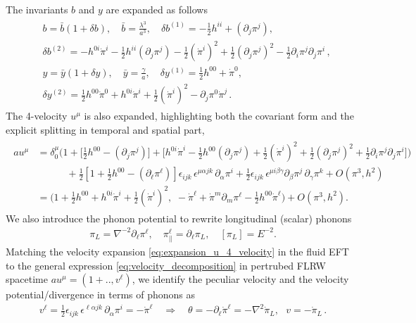 The invariants $b$ and $y$ are expanded as follows
{\small\begin{align}\label{eq:expansions_b_y}
\begin{aligned}
    &b= \bar{b}(1+\delta b),\quad \bar{b}= \frac{\lambda^3}{a^3},\quad
    \delta b^{(1)} = -\tfrac12 h^{ii} +(\partial_j \pi^j),\\[3pt]
    &\delta b^{(2)} = - h^{0 i} \dot{\pi}^i - \tfrac12  h^{ii} (\partial_j \pi^j) - \tfrac12 (\dot{\pi}^i)^2 + \tfrac12 (\partial_j \pi^j)^2 -\tfrac12 \partial_i\pi^j\partial_j\pi^i\,,
    \\[3pt]
    &y= \bar{y}(1+\delta y),\quad \bar{y}= \frac{\gamma}{a},\quad \delta y^{(1)} = \tfrac12 h^{00}+ \dot{\pi}^0,\\[3pt]
    &\delta y^{(2)} = \tfrac12 h^{00}\dot{\pi}^0+ h^{0 i} \dot{\pi}^i  + \tfrac12 (\dot{\pi}^i)^2 -\partial_j\pi^0\dot{\pi}^j\,.
\end{aligned}\end{align}}
The 4-velocity $u^\mu$ is also expanded, highlighting both the covariant form and the explicit splitting in temporal and spatial part,
{\small\begin{align}\label{eq:expansion_u_4_velocity}
\begin{aligned}
    au^\mu&=\delta_0^\mu \bigg(1 \!+\! \Big[\tfrac12 h^{00} -(\partial_j \pi^j)\Big]\! +\! \Big[ h^{0 i} \dot{\pi}^i -\tfrac12 h^{00} (\partial_j \pi^j) + \tfrac12 (\dot{\pi}^i)^2 + \tfrac12 (\partial_j \pi^j)^2 +\tfrac12 \partial_i\pi^j\partial_j\pi^i\Big]\bigg)
    \\
    &\quad\qquad+\tfrac{1}{2}\left[1 + \tfrac12 h^{00}-(\partial_\ell\pi^\ell)\right]
     \epsilon_{i j k}\,\epsilon^{\mu \alpha j k}\,\partial_\alpha\pi^i 
     +\frac{1}{2} \epsilon_{ijk}\, \epsilon^{\mu i \beta\gamma}\partial_\beta\pi^j\,\partial_\gamma\pi^k
    + O(\pi^3, h^2)\\[3pt]
    &=\Big(1 + \tfrac12 h^{00} +h^{0i}\dot{\pi}^i+ \tfrac12 (\dot{\pi}^i)^2,\,\,- \dot{\pi}^\ell + \dot{\pi}^m \partial_m\pi^\ell - \tfrac12 h^{00}\dot{\pi}^\ell\Big)+ O(\pi^3, h^2).
\end{aligned}\end{align}}
%
We also introduce the phonon potential to rewrite longitudinal (scalar) phonons
\begin{align}\label{eq:phonon_potential}
    \pi_L=\nabla^{-2}\partial_\ell\pi^\ell, \quad \pi^\ell_{\text{||}}=\partial_\ell \pi_L,\quad  [\pi_L]=E^{-2}.
\end{align}
Matching the velocity expansion \eqref{eq:expansion_u_4_velocity} in the fluid EFT to the general expression \eqref{eq:velocity_decomposition} in pertrubed FLRW spacetime $au^\mu =(1+.., v^\ell)$, we identify the peculiar velocity and the velocity potential/divergence in terms of phonons as
\begin{align}\label{eq:peculiar_velocity_fluid_vs_phonons}
    v^\ell = \frac{1}{2}\epsilon_{i j k}\,\epsilon^{\ell \alpha j k}\,\partial_\alpha\pi^i = -\dot{\pi}^\ell\quad \Rightarrow \quad \theta=-\partial_\ell\dot{\pi}^\ell= -\nabla^2\dot{\pi}_L,\,\, \,\,v = -\dot{\pi}_L\,.
\end{align}

